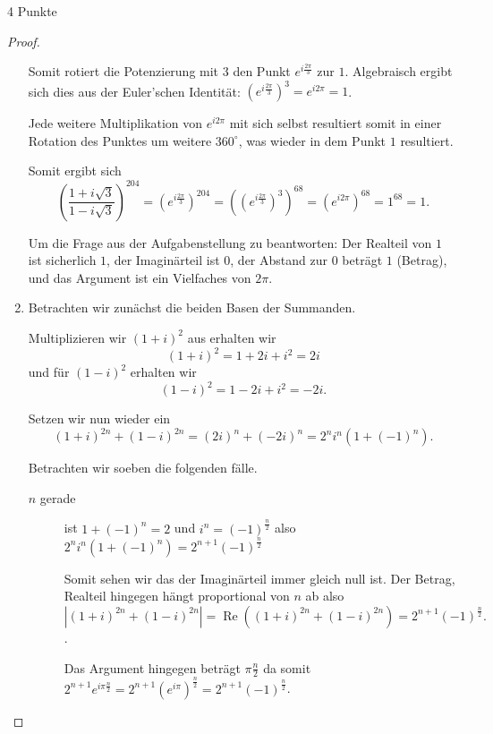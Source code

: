 \documentclass{../problemset}
\begin{document}
\begin{problem}{4 Punkte}
\begin{proof}
\begin{enumerate}
		      Somit rotiert die Potenzierung mit $3$ den Punkt $e^{i\frac{2 \pi }{3}}$ zur
		      $1$. Algebraisch ergibt sich dies aus der Euler'schen Identität: $({e^{i\frac{2
								      \pi }{3}}})^3 = e^{i2\pi} = 1$.

		      Jede weitere Multiplikation von $e^{i2\pi}$ mit sich selbst resultiert somit in
		      einer Rotation des Punktes um weitere $360^\circ$, was wieder in dem Punkt $1$
		      resultiert.

		      Somit ergibt sich
		      \[
			      {\left(\frac{1+i\sqrt{3}}{1-i\sqrt{3}}\right)}^{204}
			      = {(e^{i\frac{2 \pi }{3}} )}^{204}
				      = {({(e^{i\frac{2 \pi }{3}} )}^3)}^{68}
				      = {(e^{i2\pi})}^{68}
				      = 1^{68}
			      = 1.
		      \]

		      Um die Frage aus der Aufgabenstellung zu beantworten: Der Realteil von $1$ ist
		      sicherlich $1$, der Imaginärteil ist $0$, der Abstand zur $0$ beträgt $1$
		      (Betrag), und das Argument ist ein Vielfaches von $2\pi$.

		\item Betrachten wir zunächst die beiden Basen der Summanden.

		      Multiplizieren wir ${(1 + i)}^2$ aus erhalten wir \[
			      {(1 + i)}^2 = 1 + 2i + i^2 = 2i
		      \] und für ${(1 - i)}^2$ erhalten wir \[
			      {(1 - i)}^2 = 1 - 2i + i^2 = -2i.
		      \]

		      Setzen wir nun wieder ein
		      \[
			      (1 + i)^{2n} + (1 - i)^{2n} = {(2i)}^n + {(-2i)}^n = 2^ni^n(1+ {(-1)}^n).
		      \]

		      Betrachten wir soeben die folgenden fälle.

		      \begin{description}
			      \item[$n$ gerade]
			            ist $1+ {(-1)}^n = 2$ und $i^n = {(-1)}^\frac{n}{2}$ also $2^ni^n(1+ {(-1)}^n) = 2^{n+1}{(-1)}^{\frac{n}{2}}$

			            Somit sehen wir das der Imaginärteil immer gleich null ist. Der Betrag,
			            Realteil hingegen hängt proportional von $n$ ab also \[
				            |(1 + i)^{2n} + (1 - i)^{2n}|  = \operatorname{Re}((1 + i)^{2n} + (1 - i)^{2n}) = 2^{n+1}{(-1)}^{\frac{n}{2}}.
			            \].

			            Das Argument hingegen beträgt $\pi \frac{n}{2}$ da somit $2^{n+1}
				            e^{i\pi\frac{n}{2}} = 2^{n+1} {(e^{i\pi})}^\frac{n}{2} =
				            2^{n+1}{(-1)}^{\frac{n}{2}}$.


\end{description}
\end{enumerate}
\end{proof}
\end{problem}
\end{document}
